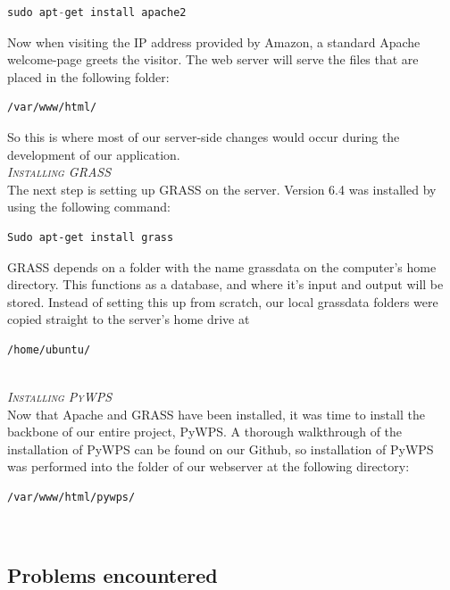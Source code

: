 \begin{lstlisting}[language=Python]
sudo apt-get install apache2 
\end{lstlisting}

Now when visiting the IP address provided by Amazon, a standard Apache welcome-page greets the visitor.
The web server will serve the files that are placed in the following folder:

\begin{lstlisting}
/var/www/html/
\end{lstlisting}

So this is where most of our server-side changes would occur during the development of our application.\\

\textsc{\textit{Installing GRASS}}\\

The next step is setting up GRASS on the server. Version 6.4 was installed by using the following command:

\begin{lstlisting}
Sudo apt-get install grass
\end{lstlisting}

GRASS depends on a folder with the name grassdata on the computer's home directory. This functions as a database, and where it's input and output will be stored. Instead of setting this up from scratch, our local grassdata folders were copied straight to the server's home drive at

\begin{lstlisting} 
/home/ubuntu/
\end{lstlisting}\\

\textsc{\textit{Installing PyWPS}}\\

Now that Apache and GRASS have been installed, it was time to install the backbone of our entire project, PyWPS.
A thorough walkthrough of the installation of PyWPS can be found on our Github, so installation of PyWPS was performed into the folder of our webserver at the following directory:

\begin{lstlisting}
/var/www/html/pywps/
\end{lstlisting}\\

\subsection{Problems encountered}\\

